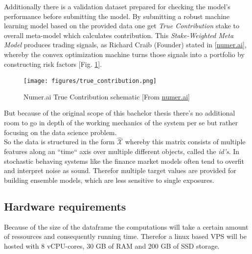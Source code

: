 \documentclass[12pt, a4paper]{article}
\begin{document}
Additionally there is a validation dataset prepared for checking the model's performance before submitting the model. By submitting a robust machine learning model based on the provided data one get \textit{True Contribution} stake to overall meta-model which calculates contribution. This \textit{Stake-Weighted Meta Model} produces trading signals, as Richard Craib (Founder) stated in [\href{https://docs.numer.ai/numerai-tournament/scoring/true-contribution-tc}{numer.ai}], whereby the convex optimization machine turns those signals into a portfolio by constructing risk factors [Fig. \ref{fig: numerai_true_contribution}]. 
\begin{figure}[!htpb]
    \centering
    \texttt{[image: figures/true\_contribution.png]}
    \caption[Numer.ai True Contribution schematic]{Numer.ai True Contribution schematic [From \href{https://docs.numer.ai/numerai-tournament/scoring/true-contribution-tc}{numer.ai}]}
    \label{fig: numerai_true_contribution}    
\end{figure}
But because of the original scope of this bachelor thesis there's no additional room to go in depth of the working mechanics of the system per se but rather focusing on the data science problem. \\
So the data is structured in the form $\hat{\mathcal{X}}$ whereby this matrix consists of multiple features along an ``time`` axis over multiple different objects, called the \textit{id's}. In stochastic behaving systems like the finance market models often tend to overfit and interpret noise as sound. Therefor multiple target values are provided for building ensemble models, which are less sensitive to single exposures. 
\subsection{Hardware requirements}
Because of the size of the dataframe the computations will take a certain amount of ressources and consequently running time. Therefor a linux based VPS will be hosted with 8 vCPU-cores, 30 GB of RAM and 200 GB of SSD storage.
\end{document}
